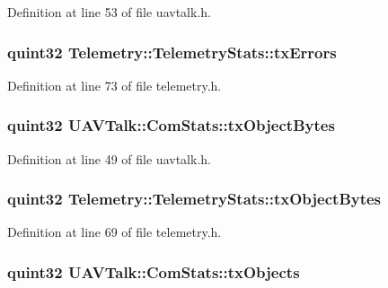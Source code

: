 Definition at line 53 of file uavtalk.\-h.

\hypertarget{group___u_a_v_talk_plugin_gad6930d8f0e5a3c2e251c9600d1264c1a}{
\subsubsection[{tx\-Errors}]{\setlength{\rightskip}{0pt plus 5cm}quint32 Telemetry\-::\-Telemetry\-Stats\-::tx\-Errors}}\label{group___u_a_v_talk_plugin_gad6930d8f0e5a3c2e251c9600d1264c1a}


Definition at line 73 of file telemetry.\-h.

\hypertarget{group___u_a_v_talk_plugin_gaf811665cd1c815ac65764deff354ba6c}{
\subsubsection[{tx\-Object\-Bytes}]{\setlength{\rightskip}{0pt plus 5cm}quint32 U\-A\-V\-Talk\-::\-Com\-Stats\-::tx\-Object\-Bytes}}\label{group___u_a_v_talk_plugin_gaf811665cd1c815ac65764deff354ba6c}


Definition at line 49 of file uavtalk.\-h.

\hypertarget{group___u_a_v_talk_plugin_ga5c315107de95913671e9bd51ce699e1f}{
\subsubsection[{tx\-Object\-Bytes}]{\setlength{\rightskip}{0pt plus 5cm}quint32 Telemetry\-::\-Telemetry\-Stats\-::tx\-Object\-Bytes}}\label{group___u_a_v_talk_plugin_ga5c315107de95913671e9bd51ce699e1f}


Definition at line 69 of file telemetry.\-h.

\hypertarget{group___u_a_v_talk_plugin_ga4d48878de025a87f65263e537467fb9b}{
\subsubsection[{tx\-Objects}]{\setlength{\rightskip}{0pt plus 5cm}quint32 U\-A\-V\-Talk\-::\-Com\-Stats\-::tx\-Objects}}\label{group___u_a_v_talk_plugin_ga4d48878de025a87f65263e537467fb9b}


